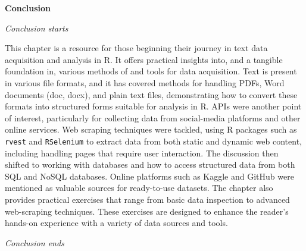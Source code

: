 \textbf{Conclusion}

\emph{Conclusion starts}

This chapter is a resource for those beginning their journey in text
data acquisition and analysis in R. It offers practical insights into, and a
tangible foundation in, various methods of and tools for data acquisition. Text
is present in various file formats, and it has covered methods for handling PDFs, Word
documents (doc, docx), and plain text files, demonstrating
how to convert these formats into structured forms suitable for analysis
in R. APIs were another point of interest, particularly for collecting
data from social-media platforms and other online services. Web scraping
techniques were tackled, using R packages such as \texttt{rvest} and
\texttt{RSelenium} to extract data from both static and dynamic web
content, including handling pages that require user interaction. The
discussion then shifted to working with databases and how to access
structured data from both SQL and NoSQL databases. Online platforms such
as Kaggle and GitHub were mentioned as valuable sources for ready-to-use
datasets. The chapter also provides practical exercises that range from basic
data inspection to advanced web-scraping techniques. These exercises are
designed to enhance the reader's hands-on experience with a variety of
data sources and tools.

\emph{Conclusion ends}